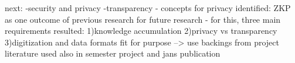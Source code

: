 next:
-security and privacy
-transparency
- concepts for privacy identified: ZKP as one outcome of previous research for future research
- for this, three main requirements resulted: 1)knowledge accumulation 2)privacy vs transparency 3)digitization and data formats fit for purpose
--> use backings from project literature used also in semester project and jans publication
\begin{comment}
-go thru zedel kliewer and list principles, say that zkps were one solution criteria mentioned already
\section{Project Introduction}
\subsection{Background}
\subsection{Initial Problem Analysis}
\subsection{Previous Work}
\subsection{Reflection}
\section{Current Project Status}
\subsection{Problem Analysis}
\subsection{Design Requirements}
\subsection{Derived Use Cases}

\begin{table}[bp]
	\centering
		\caption{Beispiel 1 zum Einfügen einer Tabelle}
		\begin{tabular}{| c c c |}
		\hline
			&&\\
			Monat & Linie & Minuten\\
			\hline
			\hline
			&&\\
			Jan & U7 & 10 \\
			Feb & U9 & 12 \\
			Mär & U9 & 20 \\
			\hline
		\end{tabular}

	\label{tab:Beispiel1}
\end{table}


\begin{figure}[tp]
	\centering
		\texttt{[image: ./Bilder/bsp2.png]}
	\caption{Beispiel 2 zum Einfügen einer Grafik}
	\label{fig:bsp2}
\end{figure}
\end{comment}
